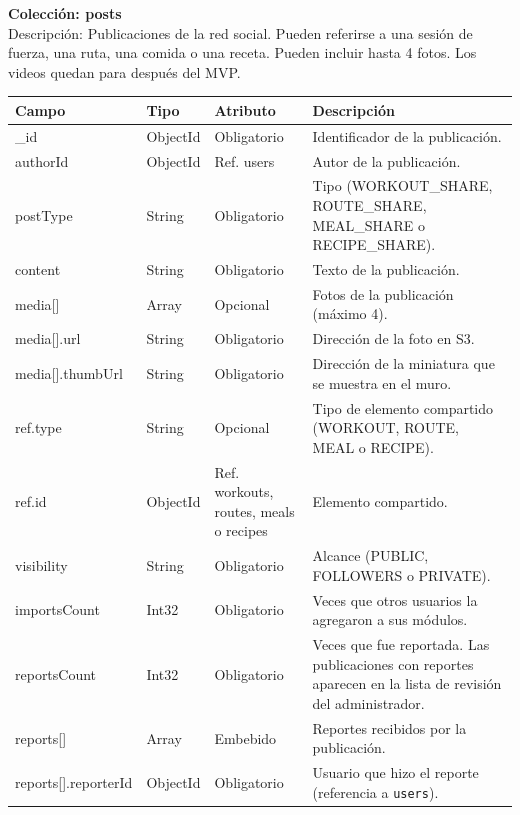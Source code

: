 \noindent\textbf{Colección: posts} \\
Descripción: Publicaciones de la red social. Pueden referirse a una sesión de fuerza, una ruta, una comida o una receta. Pueden incluir hasta 4 fotos. Los videos quedan para después del MVP.
{\footnotesize
\renewcommand{\arraystretch}{1.2}
\begin{longtable}{|>{\raggedright\arraybackslash}p{4.7cm}|>{\raggedright\arraybackslash}p{1.8cm}|>{\raggedright\arraybackslash}p{2.3cm}|>{\raggedright\arraybackslash}p{5.4cm}|}
    \hline
    \rowcolor[HTML]{EFEFEF}
    \textbf{Campo} & \textbf{Tipo} & \textbf{Atributo} & \textbf{Descripción} \\ \hline
    \endhead
    \_id & ObjectId & Obligatorio & Identificador de la publicación. \\ \hline
    authorId & ObjectId & Ref. users & Autor de la publicación. \\ \hline
    postType & String & Obligatorio & Tipo (WORKOUT\_SHARE, ROUTE\_SHARE, MEAL\_SHARE o RECIPE\_SHARE). \\ \hline
    content & String & Obligatorio & Texto de la publicación. \\ \hline
    media[] & Array & Opcional & Fotos de la publicación (máximo 4). \\ \hline
    media[].\allowbreak url & String & Obligatorio & Dirección de la foto en S3. \\ \hline
    media[].\allowbreak thumbUrl & String & Obligatorio & Dirección de la miniatura que se muestra en el muro. \\ \hline
    ref.\allowbreak type & String & Opcional & Tipo de elemento compartido (WORKOUT, ROUTE, MEAL o RECIPE). \\ \hline
    ref.\allowbreak id & ObjectId & Ref. workouts, routes, meals o recipes & Elemento compartido. \\ \hline
    visibility & String & Obligatorio & Alcance (PUBLIC, FOLLOWERS o PRIVATE). \\ \hline
    importsCount & Int32 & Obligatorio & Veces que otros usuarios la agregaron a sus módulos. \\ \hline
    reportsCount & Int32 & Obligatorio & Veces que fue reportada. Las publicaciones con reportes aparecen en la lista de revisión del administrador. \\ \hline
    reports[] & Array & Embebido & Reportes recibidos por la publicación. \\ \hline
    reports[]\allowbreak .\allowbreak reporterId & ObjectId & Obligatorio & Usuario que hizo el reporte (referencia a \texttt{users}). \\ \hline

\end{longtable}}
